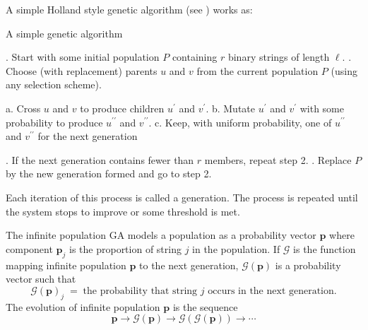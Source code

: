 A simple Holland style genetic algorithm (see \cite{Holland1975}) works as:
\begin{algorithm}
\label{realGA}
\caption*{A simple genetic algorithm}
\begin{algorithmic}[1]
. Start with some initial population $P$ containing $r$ binary strings of length $\ell$.
. Choose (with replacement) parents $u$ and $v$ from the current population $P$ (using any selection scheme).

  \Statex \hspace{\algorithmicindent} a. Cross $u$ and $v$ to produce children $u^\prime$ and $v^\prime$.
  \Statex \hspace{\algorithmicindent} b. Mutate $u^\prime$ and $v^\prime$ with some probability to produce $u^{\prime\prime}$ and $v^{\prime\prime}$.
  \Statex \hspace{\algorithmicindent} c. Keep, with uniform probability, one of $u^{\prime\prime}$ and $v^{\prime\prime}$ for the next generation
 
. If the next generation contains fewer than $r$ members, repeat step 2.
. Replace $P$ by the new generation formed and go to step 2.
\end{algorithmic}
\end{algorithm}

Each iteration of this process is called a generation. 
The process is repeated until the system stops to improve or some threshold is met.

The infinite population GA models a population as a probability vector $\bm{p}$ where component $\bm{p}_j$ 
is the proportion of string $j$ in the population. If $\mathcal{G}$ is the function mapping infinite population $\bm{p}$ to 
the next generation, $\mathcal{G}(\bm{p})$ is a probability vector such that 
\[
\mathcal{G}(\bm{p})_j \; = \; \text{the probability that string $j$ occurs in the next generation}.
\]
The evolution of infinite population $\bm{p}$ is the sequence
\[ \bm{p} \to \mathcal{G}(\bm{p}) \to  {\mathcal{G}}(\mathcal{G}(\bm{p})) \to \cdots \]

